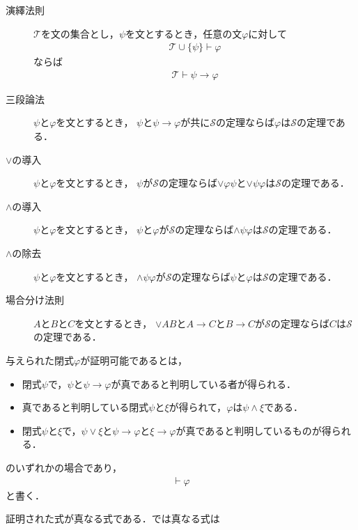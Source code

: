 	\begin{description}
		\item[演繹法則] $\mathscr{T}$を文の集合とし，$\psi$を文とするとき，任意の文$\varphi$に対して
			\begin{align}
				\mathscr{T} \cup \{\psi\} \vdash \varphi
			\end{align}
			ならば
			\begin{align}
				\mathscr{T} \vdash \psi \rightarrow \varphi
			\end{align}
			
		\item[三段論法] $\psi$と$\varphi$を文とするとき，
			$\psi$と$\psi \rightarrow \varphi$が共に$\mathscr{S}$の定理ならば$\varphi$は$\mathscr{S}$の定理である．
		
		\item[$\vee$の導入] $\psi$と$\varphi$を文とするとき，
			$\psi$が$\mathscr{S}$の定理ならば$\vee \varphi \psi$と$\vee \psi \varphi$は$\mathscr{S}$の定理である．
		
		\item[$\wedge$の導入] $\psi$と$\varphi$を文とするとき，
			$\psi$と$\varphi$が$\mathscr{S}$の定理ならば$\wedge \psi \varphi$は$\mathscr{S}$の定理である．
		
		\item[$\wedge$の除去] $\psi$と$\varphi$を文とするとき，
			$\wedge \psi \varphi$が$\mathscr{S}$の定理ならば$\psi$と$\varphi$は$\mathscr{S}$の定理である．
			
		\item[場合分け法則] $A$と$B$と$C$を文とするとき，
			$\vee A B$と$A \rightarrow C$と$B \rightarrow C$が$\mathscr{S}$の定理ならば$C$は$\mathscr{S}$の定理である．
	\end{description}
	
	与えられた閉式$\varphi$が証明可能であるとは，
	\begin{itemize}
		\item 閉式$\psi$で，$\psi$と$\psi \rightarrow \varphi$が真であると判明している者が得られる．
		\item 真であると判明している閉式$\psi$と$\xi$が得られて，$\varphi$は$\psi \wedge \xi$である．
		\item 閉式$\psi$と$\xi$で，$\psi \vee \xi$と$\psi \rightarrow \varphi$と$\xi \rightarrow \varphi$が真であると判明しているものが得られる．
	\end{itemize}
	
	のいずれかの場合であり，
	\begin{align}
		\vdash \varphi
	\end{align}
	と書く．
	
	証明された式が真なる式である．では真なる式は